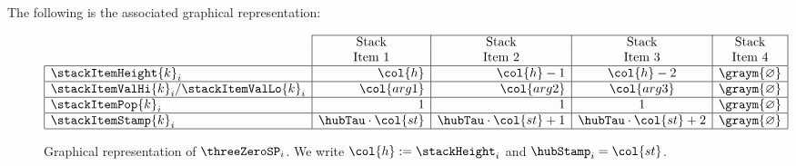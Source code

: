 \noindent The following is the associated graphical representation:
\begin{figure}[h!]
\[
	\begin{array}{|l|r|r|c|r|}
	\cline{2-5}
	\multicolumn{1}{c|}{}                              & \multicolumn{1}{c|}{\text{Stack}}  & \multicolumn{1}{c|}{\text{Stack}}  & \multicolumn{1}{c|}{\text{Stack}}  & \multicolumn{1}{c|}{\text{Stack}}  \\
	\multicolumn{1}{c|}{}                              & \multicolumn{1}{c|}{\text{Item 1}} & \multicolumn{1}{c|}{\text{Item 2}} & \multicolumn{1}{c|}{\text{Item 3}} & \multicolumn{1}{c|}{\text{Item 4}} \\ \hline
	\stackItemHeight {k} _{i}                          & \col{h}                            & \col{h} - 1                        & \col{h} -  2                       & \graym{\varnothing}                \\ \hline
	\stackItemValHi  {k} _{i} / \stackItemValLo{k}_{i} & \col{arg1}                         & \col{arg2}                         & \col{arg3}                         & \graym{\varnothing}                \\ \hline
	\stackItemPop    {k} _{i}                          & 1                                  & 1                                  & 1                                  & \graym{\varnothing}                \\ \hline
	\stackItemStamp  {k} _{i}                          & \hubTau \cdot \col{st}             & \hubTau \cdot \col{st} + 1         & \hubTau \cdot \col{st} + 2         & \graym{\varnothing}                \\ \hline
	\end{array}
\]
\caption{%
Graphical representation of $\threeZeroSP _{i}$.
We write $\col{h} := \stackHeight_{i}$ and $\hubStamp_{i} = \col{st}$.}
\end{figure}

